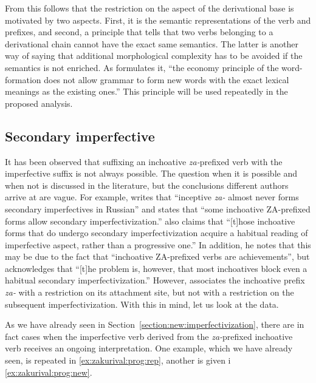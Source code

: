 From this follows that the restriction on the aspect of the derivational base is motivated by two aspects. First, it is the semantic representations of the verb and prefixes, and second, a principle that tells that two verbs belonging to a derivational chain cannot have the exact same semantics. The latter is another way of saying that additional morphological complexity has to be avoided if the semantics is not enriched. As \citet{Braginsky:08} formulates it, ``the economy principle of the word-formation does not allow grammar to form new words with the
exact lexical meanings as the existing ones.'' This principle will be used repeatedly in the proposed analysis.


\subsection{Secondary imperfective}
It has been observed that suffixing an inchoative \textit{za-}prefixed verb with the imperfective suffix is not always possible. The question when it is possible and when not is discussed in the literature, but the conclusions different authors arrive at are vague. For example, \citet[230]{Svenonius:04b} writes that ``inceptive \textit{za-} almost never forms secondary imperfectives in Russian'' and \citet[220]{Braginsky:08} states that ``some inchoative ZA-prefixed forms allow secondary imperfectivization.'' \citet[231]{Braginsky:08} also claims that ``[t]hose inchoative forms that do undergo secondary imperfectivization acquire a habitual reading of imperfective aspect, rather than a progressive one.'' In addition, he notes that this may be due to the fact that ``inchoative ZA-prefixed verbs are achievements'', but acknowledges that ``[t]he problem is, however, that most inchoatives block even a habitual secondary imperfectivization.'' However, \citet{Tatevosov:09} associates the inchoative prefix \textit{za-} with a restriction on its attachment site, but not with a restriction on the subsequent imperfectivization. With this in mind, let us look at the data. 

As we have already seen in Section~\ref{section:new:imperfectivization}, there are in fact cases when the imperfective verb derived from the \textit{za-}prefixed inchoative verb receives an ongoing interpretation. One example, which we have already seen, is repeated in \ref{ex:zakurival:prog:rep}, another is given i \ref{ex:zakurival:prog:new}.

